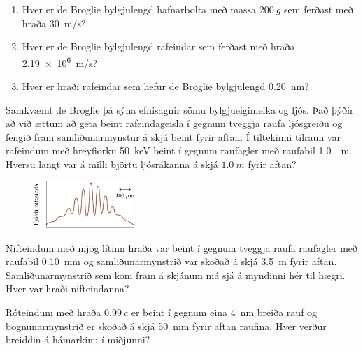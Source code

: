 \begin{enumerate}[label = \textbf{(\alph*)}]



\item[\textbf{(38.16)}] \begin{enumerate}[label = \textbf{(\alph*)}]
    \item Hver er de Broglie bylgjulengd hafnarbolta með massa $\SI{200}{g}$ sem ferðast með hraða \SI{30}{m/s}?
    \item Hver er de Broglie bylgjulengd rafeindar sem ferðast með hraða \SI{2.19e6}{m/s}?
    \item Hver er hraði rafeindar sem hefur de Broglie bylgjulengd \SI{0.20}{nm}?
\end{enumerate}

\item[\textbf{(38.47)}] Samkvæmt de Broglie þá sýna efnisagnir sömu bylgjueiginleika og ljós. Það þýðir að við ættum að geta beint rafeindageisla í gegnum tveggja raufa ljósgreiðu og fengið fram samliðunarmynstur á skjá beint fyrir aftan. Í tiltekinni tilraun var rafeindum með hreyfiorku \SI{50}{keV} beint í gegnum raufagler með raufabil \SI{1.0}{\mu m}. Hversu langt var á milli björtu ljósrákanna á skjá $\SI{1.0}{m}$ fyrir aftan?

\begin{minipage}{\linewidth}
\begin{figure}
\vspace{-0.5cm}
\includegraphics[width = 1.5in]{figures/fjoldi-nift.pdf}
\end{figure}

\item[\textbf{(38.49)}] Nifteindum með mjög lítinn hraða var beint í gegnum tveggja raufa raufagler með raufabil \SI{0.10}{mm} og samliðunarmynstrið var skoðað á skjá \SI{3.5}{m} fyrir aftan. Samliðunarmynstrið sem kom fram á skjánum má sjá á myndinni hér til hægri. Hver var hraði nifteindanna?

\end{minipage}

\item[\textbf{(38.48)}] Róteindum með hraða $\SI{0.99}{}c$ er beint í gegnum eina \SI{4}{nm} breiða rauf og bognunarmynstrið er skoðað á skjá \SI{50}{mm} fyrir aftan raufina. Hver verður breiddin á hámarkinu í miðjunni?


\end{enumerate}
